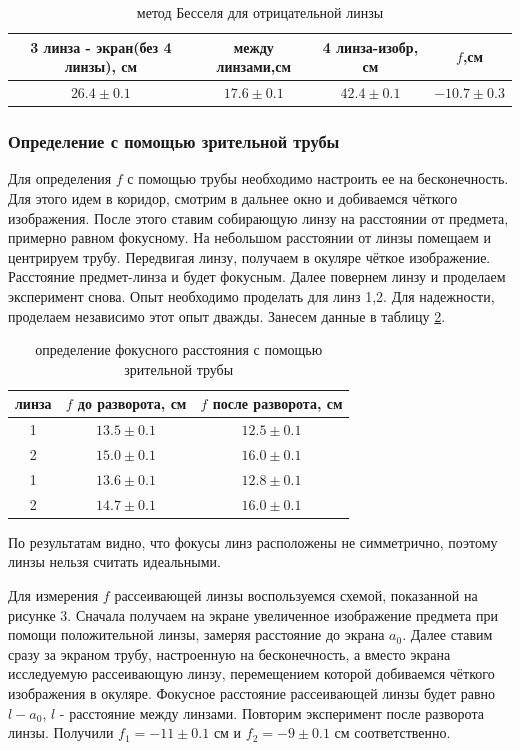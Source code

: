 \documentclass[a4paper,12pt]{article}
\begin{document}
\begin{table} [bhtp!] 
	
	\centering
	\begin{tabular}{|c|c|c|c|}
		\hline
		3 линза - экран(без 4 линзы), см & между линзами,см & 4 линза-изобр, см&   $f$,см\\\hline
		$26.4\pm0.1$ & $17.6\pm 0.1$&$42.4\pm 0.1$ & $-10.7\pm 0.3$ \\\hline
	\end{tabular}
	\caption{метод Бесселя для отрицательной линзы}
	\label{tab:3}
\end{table}


\subsubsection*{Определение с помощью зрительной трубы}
Для определения $f$ с помощью трубы необходимо настроить ее на бесконечность. Для этого идем в коридор, смотрим в дальнее окно и добиваемся чёткого изображения. После этого ставим собирающую линзу на расстоянии от предмета, примерно равном фокусному. На небольшом расстоянии от линзы помещаем и центрируем  трубу. Передвигая линзу,  получаем в окуляре  чёткое изображение. Расстояние предмет-линза и будет фокусным. Далее повернем линзу и проделаем эксперимент снова. Опыт необходимо проделать для линз 1,2. Для надежности, проделаем независимо этот опыт дважды. Занесем данные в таблицу \ref{tab:4}.

\begin{table}  [bhtp!]
	\centering
	\begin{tabular}{|c|c|c|}
		\hline
		линза & $f$ до разворота, см &$f$ после разворота, см
		\\\hline
		1& $13.5\pm0.1$& $12.5\pm0.1$ 
		\\\hline
		2& $15.0\pm0.1$& $16.0\pm0.1$ 
		\\\hline
		1& $13.6\pm0.1$& $12.8\pm0.1$ 
		\\\hline
		2& $14.7\pm0.1$&$16.0\pm0.1$
		\\\hline
	\end{tabular}
	\caption{определение фокусного расстояния с помощью зрительной трубы}
	\label{tab:4}
\end{table}

По результатам видно, что фокусы линз расположены не симметрично, поэтому линзы нельзя считать идеальными.

Для измерения $f$ рассеивающей линзы воспользуемся схемой, показанной на рисунке 3. Сначала получаем на экране увеличенное изображение предмета при помощи положительной линзы, замеряя расстояние до экрана $a_0$. Далее ставим сразу за экраном трубу, настроенную на бесконечность, а вместо экрана исследуемую рассеивающую линзу, перемещением которой добиваемся чёткого изображения в окуляре. Фокусное расстояние рассеивающей линзы будет равно $l-a_0$, $l$ - расстояние между линзами. Повторим эксперимент после разворота линзы.  Получили 
$f_1 = - 11\pm0.1$ см и $f_2 = -9\pm0.1$ см соответственно.
\end{document}
